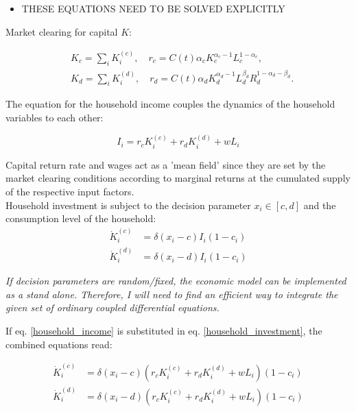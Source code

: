\begin{itemize}
	\item THESE EQUATIONS NEED TO BE SOLVED EXPLICITLY
\end{itemize}

Market clearing for capital $K$:

\begin{align}
	&K_c = \sum_i K_i^{(c)}, \quad r_c = C(t)\alpha_c K_c^{\alpha_c-1} L_c^{1-\alpha_c}, \\
	&K_d = \sum_i K_i^{(d)}, \quad r_d = C(t)\alpha_d K_d^{\alpha_d-1} L_d^{\beta_d}R_d^{1-\alpha_d - \beta_d}.
	\label{capital_market_clearing}
\end{align}

The equation for the household income couples the dynamics of the household variables to each other:

\begin{equation}
	I_i = r_c K_i^{(c)} + r_d K_i^{(d)} + wL_i
	\label{household_income}
\end{equation}

Capital return rate and wages act as a 'mean field' since they are set by the market clearing conditions according to marginal returns at the cumulated supply of the respective input factors. \\

Household investment is subject to the decision parameter $x_i \in [c,d]$ and the consumption level of the household:
\begin{align}
	\dot{K}_i^{(c)} &= \delta(x_i-c)I_i(1-c_i) \\
	\dot{K}_i^{(d)} &= \delta(x_i-d)I_i(1-c_i)
	\label{household_investment}
\end{align}

\textit{If decision parameters are random/fixed, the economic model can be implemented as a stand alone.
Therefore, I will need to find an efficient way to integrate the given set of ordinary coupled differential equations.}

If eq. \eqref{household_income} is substituted in eq. \eqref{household_investment}, the combined equations read:

\begin{align}
	\dot{K}_i^{(c)} &= \delta(x_i-c)(r_c K_i^{(c)} + r_d K_i^{(d)} + wL_i)(1 -c_i) \\
	\dot{K}_i^{(d)} &= \delta(x_i-d)(r_c K_i^{(c)} + r_d K_i^{(d)} + wL_i)(1 -c_i)
	\label{household_capital_dynamics}
\end{align}


